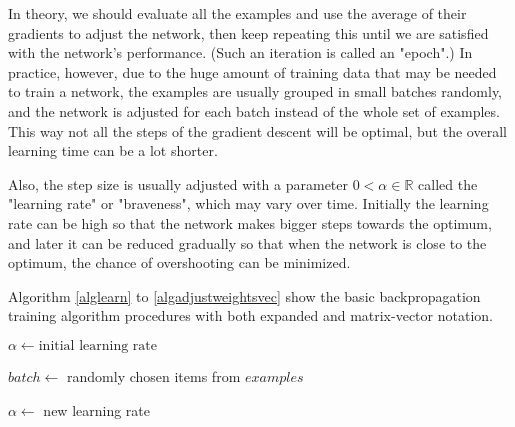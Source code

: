 \documentclass{article}
\begin{document}
      In theory, we should evaluate all the examples and use the average of
      their gradients to adjust the network, then keep repeating this until we
      are satisfied with the network's performance. (Such an iteration is
      called an "epoch".) In practice, however, due to the huge amount of
      training data that may be needed to train a network, the examples are
      usually grouped in small batches randomly, and the network is adjusted
      for each batch instead of the whole set of examples. This way not all the
      steps of the gradient descent will be optimal, but the overall learning
      time can be a lot shorter.

      Also, the step size is usually adjusted with a parameter
      $0 < \alpha \in \mathbb{R}$ called the "learning rate" or "braveness",
      which may vary over time. Initially the learning rate can be high so that
      the network makes bigger steps towards the optimum, and later it can be
      reduced gradually so that when the network is close to the optimum, the
      chance of overshooting can be minimized.

      Algorithm \ref{alglearn} to \ref{algadjustweightsvec} show the basic
      backpropagation training algorithm procedures with both expanded and
      matrix-vector notation.

      \begin{algorithm}
        \caption{%
          Train the network with the given set of examples. An example is an
          $(\mathbf{x}, \mathbf{y})$ pair where
          $\mathbf{x} \in \mathbb{R}^{n_0}$ is an example input, and
          $\mathbf{y} \in \mathbb{R}^{n_L}$ is the desired output for
          $\mathbf{x}$.
        } \label{alglearn}
        \begin{algorithmic}
            \State $\alpha \gets \text{initial learning rate}$
            \State {}

            \Repeat
              \State $batch \gets$ randomly chosen items from $examples$
              \State {}

                \State {}
                \State {}
              \EndFor

              \State {}

              \State $\alpha \gets$ new learning rate
          \EndProcedure
        \end{algorithmic}
      \end{algorithm}
\end{document}
